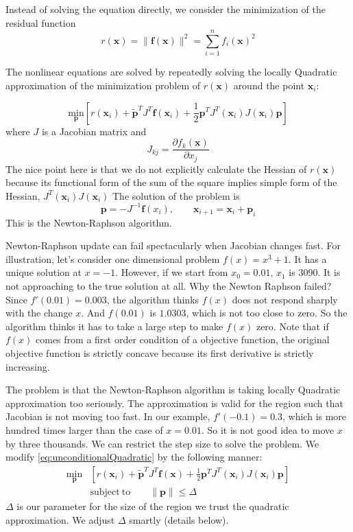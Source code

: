\documentclass[12pt]{article}
\def\min#1{{\underset{#1}{\mathrm{min}}}}
\def\pdiff#1#2{\frac{\partial #1}{\partial #2}}
\def\xb{{\mathbf{x}}}
\def\fb{{\mathbf{f}}}
\def\pb{{\mathbf{p}}}
\newcommand{\be}{\begin{equation}}
\newcommand{\ee}{\end{equation}}
\begin{document}
Instead of solving the equation directly, we consider the minimization of the residual function
\[
r(\xb) = \|\fb(\xb)\|^2 = \sum_{i=1}^n f_i(\xb)^2
\]

The nonlinear equations are	solved by repeatedly solving the locally Quadratic approximation of
the minimization problem of $r(\xb)$ around the point $\xb_i$: 

\be \label{eq:unconditionalQuadratic}
\min{\pb} \left[ r(\xb_i) + \tilde{\pb}^T J^T\fb(\xb_i)  + 
		\frac{1}{2} \pb^T J^T(\xb_i) J(\xb_i)\pb\right] 
\ee
where $J$ is a Jacobian matrix and
\[
J_{kj} =\pdiff{f_k(\xb)}{x_j} 
\]
The nice point here is that we do not explicitly calculate the Hessian of $r(\xb)$ because its
functional form of the sum of the square implies simple form of the Hessian, $ J^T(\xb_i)
J(\xb_i)$
The solution of the problem is
\[
\pb = - J^{-1}\fb(x_i),\qquad \xb _{i+1} = \xb_i + \pb_i
\]
This is the Newton-Raphson algorithm. 

Newton-Raphson update can fail spectacularly when Jacobian changes fast. For illustration, let's
consider one dimensional problem $f(x) = x^3+1$. It has a unique solution at $x = -1 $. However,
if we start from $x_0=0.01$, $x_1 $ is 3090. It is not approaching to the true solution at all.
Why the Newton Raphson failed? Since $f'(0.01) = 0.003$, the algorithm thinks $f(x)$ does not
respond sharply with the change $x$. And $f(0.01)$ is $ 1.0303$, which is not too close to zero. So
the algorithm thinks it has to take a large step to make $f(x)$ zero.  Note that if $f(x)$ comes
from a first order condition of a objective function, the original objective function is strictly
concave because its first derivative is strictly increasing.


The problem is that the Newton-Raphson algorithm is taking locally Quadratic approximation too
seriously. The approximation is valid for the region such that Jacobian is not moving too fast. In
our example, $f'(-0.1) = 0.3$, which is more hundred times larger than the case of $x=0.01$. So it
is not good idea to move $x$ by three thousands. We can restrict the step size to solve the
problem.  We modify \eqref{eq:unconditionalQuadratic} by the following manner:
\begin{align}
\min{\pb} &\left[ r(\xb_i) + \tilde{\pb}^T J^{T}\fb(\xb)  + 
	\frac{1}{2} \pb^T J^T(\xb_i) J(\xb_i)\pb\right] 
\label{eq:conditionalQuadratic} \\
&\mathrm{subject \ to}\qquad \|\pb\| \le \Delta
\end{align}
$\Delta$ is our parameter for the size of the region we trust the quadratic approximation. We
adjust $\Delta$ smartly (details below). 
\end{document}

